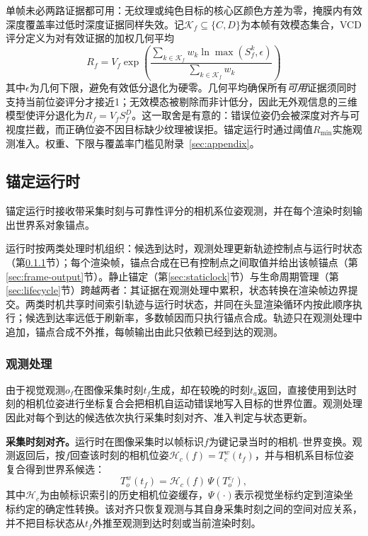 \documentclass[review]{vgtc}
\begin{document}
单帧未必两路证据都可用：无纹理或纯色目标的核心区颜色方差为零，掩膜内有效深度覆盖率过低时深度证据同样失效。记$\mathcal{K}_f \subseteq \{C, D\}$为本帧有效模态集合，VCD评分定义为对有效证据的加权几何平均
\begin{equation}
R_f = V_f \exp\!\left(\frac{\sum_{k \in \mathcal{K}_f} w_k \ln \max(S_f^{k}, \epsilon)}{\sum_{k \in \mathcal{K}_f} w_k}\right)
\label{eq:vcd}
\end{equation}
其中$\epsilon$为几何下限，避免有效低分退化为硬零。几何平均确保所有\emph{可用}证据须同时支持当前位姿评分才接近1；无效模态被剔除而非计低分，因此无外观信息的三维模型使评分退化为$R_f = V_f S_f^D$。这一取舍是有意的：错误位姿仍会被深度对齐与可视度拦截，而正确位姿不因目标缺少纹理被误拒。锚定运行时通过阈值$R_{\min}$实施观测准入。权重、下限与覆盖率门槛见附录~\ref{sec:appendix}。

\subsection{锚定运行时}\label{sec:anchoring}

锚定运行时接收带采集时刻与可靠性评分的相机系位姿观测，并在每个渲染时刻输出世界系对象锚点。

运行时按两类处理时机组织：候选到达时，观测处理更新轨迹控制点与运行时状态（第\ref{sec:obs-update}节）；每个渲染帧，锚点合成在已有控制点之间取值并给出该帧锚点（第\ref{sec:frame-output}节）。静止锚定（第\ref{sec:staticlock}节）与生命周期管理（第\ref{sec:lifecycle}节）跨越两者：其证据在观测处理中累积，状态转换在渲染帧边界提交。两类时机共享时间索引轨迹与运行时状态，并同在头显渲染循环内按此顺序执行；候选到达率远低于刷新率，多数帧因而只执行锚点合成。轨迹只在观测处理中追加，锚点合成不外推，每帧输出由此只依赖已经到达的观测。

\subsubsection{观测处理}\label{sec:obs-update}

由于视觉观测$o_f$在图像采集时刻$t_f$生成，却在较晚的时刻$t_a$返回，直接使用到达时刻的相机位姿进行坐标复合会把相机自运动错误地写入目标的世界位置。观测处理因此对每个到达的候选依次执行采集时刻对齐、准入判定与状态更新。

\textbf{采集时刻对齐。}运行时在图像采集时以帧标识$f$为键记录当时的相机--世界变换。观测返回后，按$f$回查该时刻的相机位姿$\mathcal{H}_c(f) = T_c^w(t_f)$，并与相机系目标位姿复合得到世界系候选：
\begin{equation}
T_o^w(t_f)
=
\mathcal{H}_c(f)\,
\Psi\!\left(T_o^{c_f}\right),
\label{eq:capture-alignment}
\end{equation}
其中$\mathcal{H}_c$为由帧标识索引的历史相机位姿缓存，$\Psi(\cdot)$表示视觉坐标约定到渲染坐标约定的确定性转换。该对齐只恢复观测与其自身采集时刻之间的空间对应关系，并不把目标状态从$t_f$外推至观测到达时刻或当前渲染时刻。
\end{document}
